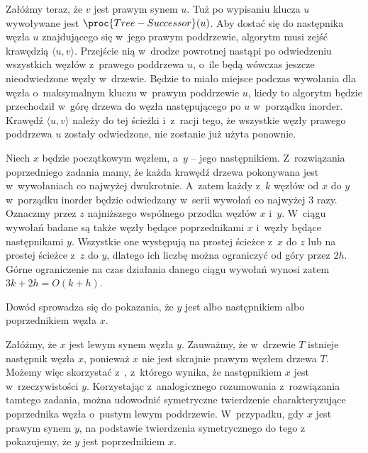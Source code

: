 Załóżmy teraz, że $v$ jest prawym synem $u$.
Tuż po wypisaniu klucza $u$ wywoływane jest $\proc{Tree-Successor}(u)$.
Aby dostać się do następnika węzła $u$ znajdującego się w~jego prawym poddrzewie, algorytm musi zejść krawędzią $\langle u,v\rangle$.
Przejście nią w~drodze powrotnej nastąpi po odwiedzeniu wszystkich węzłów z~prawego poddrzewa $u$, o~ile będą wówczas jeszcze nieodwiedzone węzły w~drzewie.
Będzie to miało miejsce podczas wywołania  dla węzła o~maksymalnym kluczu w~prawym poddrzewie $u$, kiedy to algorytm będzie przechodził w~górę drzewa do węzła następującego po $u$ w~porządku inorder.
Krawędź $\langle u,v\rangle$ należy do tej ścieżki i~z~racji tego, że wszystkie węzły prawego poddrzewa $u$ zostały odwiedzone, nie zostanie już użyta ponownie.

\exercise %
Niech $x$ będzie początkowym węzłem, a~$y$ -- jego  następnikiem.
Z~rozwiązania poprzedniego zadania mamy, że każda krawędź drzewa pokonywana jest w~wywołaniach  co najwyżej dwukrotnie.
A~zatem każdy z~$k$ węzłów od $x$ do $y$ w~porządku inorder będzie odwiedzany w~serii wywołań  co najwyżej 3 razy.
Oznaczmy przez $z$ najniższego wspólnego przodka węzłów $x$ i~$y$.
W~ciągu wywołań  badane są także węzły będące poprzednikami $x$ i~węzły będące następnikami $y$.
Wszystkie one występują na prostej ścieżce z~$x$ do $z$ lub na prostej ścieżce z~$z$ do $y$, dlatego ich liczbę można ograniczyć od góry przez $2h$.
Górne ograniczenie na czas działania danego ciągu wywołań wynosi zatem $3k+2h=O(k+h)$.

\exercise %

\noindent Dowód sprowadza się do pokazania, że $y$ jest albo następnikiem albo poprzednikiem węzła $x$.

Załóżmy, że $x$ jest lewym synem węzła $y$.
Zauważmy, że w~drzewie $T$ istnieje następnik węzła $x$, ponieważ $x$ nie jest skrajnie prawym węzłem drzewa $T$.
Możemy więc skorzystać z~, z~którego wynika, że następnikiem $x$ jest w~rzeczywistości $y$.
Korzystając z~analogicznego rozumowania z~rozwiązania tamtego zadania, można udowodnić symetryczne twierdzenie charakteryzujące poprzednika węzła o~pustym lewym poddrzewie.
W~przypadku, gdy $x$ jest prawym synem $y$, na podstawie twierdzenia symetrycznego do tego z~ pokazujemy, że $y$ jest poprzednikiem $x$.
